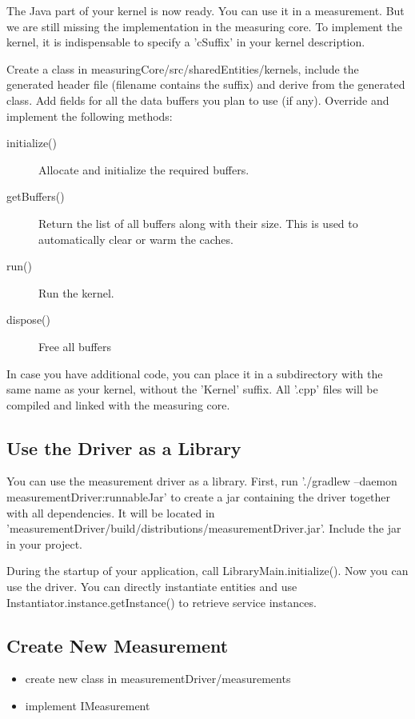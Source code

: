 \documentclass[a4paper,12pt]{article}
\newcommand{\method}[1]{\textsf{#1}}
\begin{document}
The Java part of your kernel is now ready. You can use it in a measurement. But
we are still missing the implementation in the measuring core. To implement the
kernel, it is indispensable to specify a 'cSuffix' in your kernel description.

Create a class in measuringCore/src/sharedEntities/kernels, include the
generated header file (filename contains the suffix) and derive from the
generated class. Add fields for all the data buffers you plan to use
(if any). Override and implement the following methods:
\begin{description}
\item[\method{initialize()}] Allocate and initialize the required buffers.
\item[\method{getBuffers()}] Return the list of all buffers along with their
size. This is used to automatically clear or warm the caches.
\item[\method{run()}] Run the kernel.
\item[\method{dispose()}] Free all buffers
\end{description}

In case you have additional code, you can place it in a subdirectory with the
same name as your kernel, without the 'Kernel' suffix. All '.cpp' files will be
compiled and linked with the measuring core.

\subsection{Use the Driver as a Library}
You can use the measurement driver as a library. First, run './gradlew
--daemon measurementDriver:runnableJar' to create a jar containing the driver
together with all dependencies. It will be located in
'measurementDriver/build/distributions/measurementDriver.jar'. Include the jar
in your project.

During the startup of your application, call LibraryMain.initialize(). Now you
can use the driver. You can directly instantiate entities and use
\method{Instantiator.instance.getInstance()} to retrieve service instances.

\subsection{Create New Measurement}
\begin{itemize}
\item create new class in measurementDriver/measurements
\item implement IMeasurement
\end{itemize}
\end{document}
